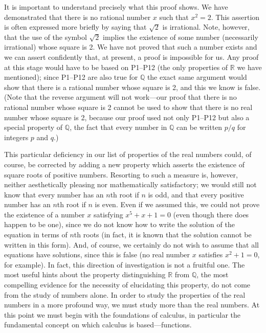 It is important to understand precisely what this proof shows. We have
demonstrated that there is no rational number $x$ such that $x^2 = 2$. This
assertion is often expressed more briefly by saying that $\sqrt{2}$ is
irrational. Note, however, that the use of the symbol $\sqrt{2}$ implies the
existence of some number (necessarily irrational) whose square is 2. We have
not proved that such a number exists and we can assert confidently that, at
present, a proof is impossible for us. Any proof at this stage would have to
be based on P1--P12 (the only properties of $\mathbb{R}$ we have mentioned);
since P1--P12 are also true for $\mathbb{Q}$ the exact same argument would
show that there is a rational number whose square is 2, and this we know is
false. (Note that the reverse argument will not work---our proof that there is
no rational number whose square is 2 cannot be used to show that there is no
real number whose square is 2, because our proof used not only P1--P12 but
also a special property of $\mathbb{Q}$, the fact that every number in
$\mathbb{Q}$ can be written $p/q$ for integers $p$ and $q$.)

This particular deficiency in our list of properties of the real numbers
could, of course, be corrected by adding a new property which asserts the
existence of square roots of positive numbers. Resorting to such a measure
is, however, neither aesthetically pleasing nor mathematically satisfactory;
we would still not know that every number has an $n$th root if $n$ is odd, and
that every positive number has an $n$th root if $n$ is even. Even if we
assumed this, we could not prove the existence of a number $x$ satisfying
$x^5 + x + 1 = 0$ (even though there does happen to be one), since we do not
know how to write the solution of the equation in terms of $n$th roots (in
fact, it is known that the solution cannot be written in this form). And, of
course, we certainly do not wish to assume that all equations have solutions,
since this is false (no real number $x$ satisfies $x^2 + 1 = 0$, for example).
In fact, this direction of investigation is not a fruitful one. The most
useful hints about the property distinguishing $\mathbb{R}$ from
$\mathbb{Q}$, the most compelling evidence for the necessity of elucidating
this property, do not come from the study of numbers alone. In order to study
the properties of the real numbers in a more profound way, we must study more
than the real numbers. At this point we must begin with the foundations of
calculus, in particular the fundamental concept on which calculus is
based---functions.

